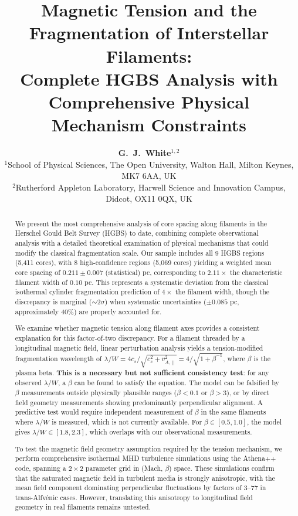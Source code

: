 \documentclass[11pt,a4paper]{article}
\title{\textbf{Magnetic Tension and the Fragmentation of Interstellar Filaments:\\
Complete HGBS Analysis with Comprehensive Physical Mechanism Constraints}}
\author{\textbf{G.~J.~White$^{1,2}$}\\
\small{$^{1}$School of Physical Sciences, The Open University, Walton Hall, Milton Keynes, MK7 6AA, UK}\\
\small{$^{2}$Rutherford Appleton Laboratory, Harwell Science and Innovation Campus, Didcot, OX11 0QX, UK}}
\begin{document}
\maketitle

\begin{abstract}
We present the most comprehensive analysis of core spacing along filaments in the Herschel Gould Belt Survey (HGBS) to date, combining complete observational analysis with a detailed theoretical examination of physical mechanisms that could modify the classical fragmentation scale. Our sample includes all 9 HGBS regions (5,411 cores), with 8 high-confidence regions (5,069 cores) yielding a weighted mean core spacing of $0.211 \pm 0.007$ (statistical) pc, corresponding to $2.11\times$ the characteristic filament width of $0.10$ pc. This represents a systematic deviation from the classical isothermal cylinder fragmentation prediction of $4\times$ the filament width, though the discrepancy is marginal ($\sim2\sigma$) when systematic uncertainties ($\pm0.085$ pc, approximately 40\%) are properly accounted for.

We examine whether magnetic tension along filament axes provides a consistent explanation for this factor-of-two discrepancy. For a filament threaded by a longitudinal magnetic field, linear perturbation analysis yields a tension-modified fragmentation wavelength of $\lambda/W = 4c_s/\sqrt{c_s^2 + v_{A,\parallel}^2} = 4/\sqrt{1 + \beta^{-1}}$, where $\beta$ is the plasma beta. \textbf{This is a necessary but not sufficient consistency test}: for any observed $\lambda/W$, a $\beta$ can be found to satisfy the equation. The model can be falsified by $\beta$ measurements outside physically plausible ranges ($\beta < 0.1$ or $\beta > 3$), or by direct field geometry measurements showing predominantly perpendicular alignment. A predictive test would require independent measurement of $\beta$ in the same filaments where $\lambda/W$ is measured, which is not currently available. For $\beta \in [0.5, 1.0]$, the model gives $\lambda/W \in [1.8, 2.3]$, which overlaps with our observational measurements.

To test the magnetic field geometry assumption required by the tension mechanism, we perform comprehensive isothermal MHD turbulence simulations using the Athena++ code, spanning a $2\times2$ parameter grid in (Mach, $\beta$) space. These simulations confirm that the saturated magnetic field in turbulent media is strongly anisotropic, with the mean field component dominating perpendicular fluctuations by factors of 3--77 in trans-Alfv\'enic cases. However, translating this anisotropy to longitudinal field geometry in real filaments remains untested.


\end{abstract}
\end{document}
